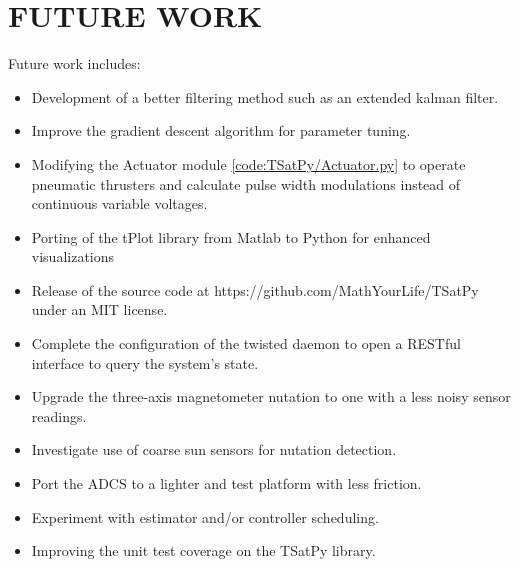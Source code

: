 \section{FUTURE WORK}
\label{chap:FutureWork}


Future work includes:

\begin{itemize}
\item Development of a better filtering method such as an extended kalman filter.
\item Improve the gradient descent algorithm for parameter tuning.
\item Modifying the Actuator module \ref{code:TSatPy/Actuator.py} to operate pneumatic thrusters and calculate pulse width modulations instead of continuous variable voltages.
\item Porting of the tPlot library from Matlab to Python for enhanced visualizations
\item Release of the source code at https://github.com/MathYourLife/TSatPy under an MIT license.
\item Complete the configuration of the twisted daemon to open a RESTful interface to query the system's state.
\item Upgrade the three-axis magnetometer nutation to one with a less noisy sensor readings.
\item Investigate use of coarse sun sensors for nutation detection.
\item Port the ADCS to a lighter and test platform with less friction.
\item Experiment with estimator and/or controller scheduling.
\item Improving the unit test coverage on the TSatPy library.
\end{itemize}

